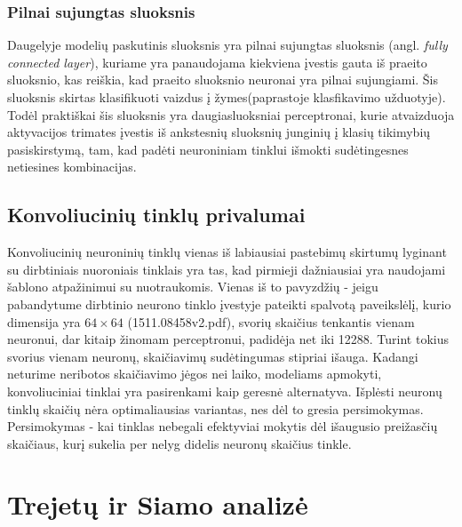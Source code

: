 \documentclass{VUMIFPSkursinis}
\DeclareRobustCommand{\[}{\begin{equation}}
\DeclareRobustCommand{\]}{\end{equation}}
\begin{document}
\subsubsection{Pilnai sujungtas sluoksnis}
Daugelyje modelių paskutinis sluoksnis yra pilnai sujungtas sluoksnis (angl. \textit{fully connected
layer}), kuriame yra panaudojama kiekviena įvestis gauta iš praeito sluoksnio, kas reiškia,  kad praeito sluoksnio neuronai yra pilnai sujungiami. Šis sluoksnis skirtas klasifikuoti vaizdus į žymes(paprastoje klasfikavimo užduotyje). Todėl praktiškai šis sluoksnis yra daugiasluoksniai perceptronai, kurie atvaizduoja aktyvacijos trimates įvestis iš ankstesnių sluoksnių junginių į klasių tikimybių pasiskirstymą, tam, kad padėti neuroniniam tinklui išmokti sudėtingesnes netiesines kombinacijas.

\subsection{Konvoliucinių tinklų privalumai}
Konvoliucinių neuroninių tinklų vienas iš labiausiai pastebimų skirtumų lyginant su dirbtiniais nuoroniais tinklais yra tas, kad pirmieji dažniausiai yra naudojami šablono atpažinimui su nuotraukomis. Vienas iš to pavyzdžių - jeigu pabandytume dirbtinio neurono tinklo įvestyje pateikti spalvotą paveikslėlį, kurio dimensija yra $64\times 64$ (1511.08458v2.pdf), svorių skaičius tenkantis vienam neuronui, dar kitaip žinomam perceptronui, padidėja net iki 12288. Turint tokius svorius vienam neuronų, skaičiavimų sudėtingumas stipriai išauga. Kadangi neturime neribotos skaičiavimo jėgos nei laiko, modeliams apmokyti, konvoliuciniai tinklai yra pasirenkami kaip geresnė alternatyva. Išplėsti neuronų tinklų skaičių nėra optimaliausias variantas, nes dėl to gresia persimokymas. Persimokymas - kai tinklas nebegali efektyviai mokytis dėl išaugusio preižasčių skaičiaus, kurį sukelia per nelyg didelis neuronų skaičius tinkle.
\newline

\section{Trejetų ir Siamo analizė}
\end{document}
